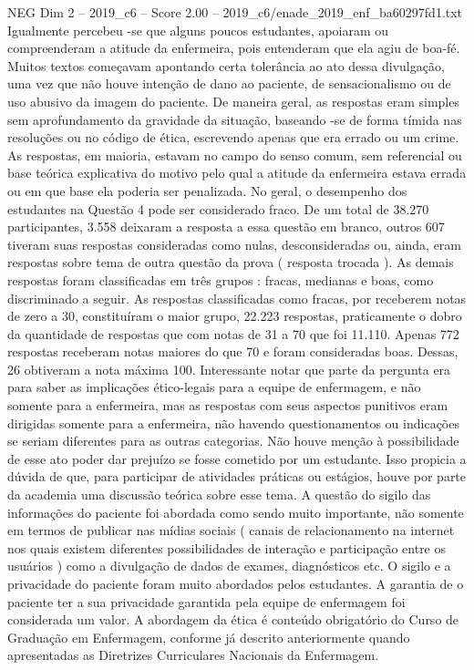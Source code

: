 \begin{textsample}{NEG Dim 2 – 2019\_c6 – Score 2.00 – 2019\_c6/enade\_2019\_enf\_ba60297fd1.txt}
Igualmente percebeu -se que alguns poucos estudantes, apoiaram ou compreenderam a atitude da enfermeira, pois entenderam que ela agiu de boa-fé.
Muitos textos começavam apontando certa tolerância ao ato dessa divulgação, uma vez que não houve intenção de dano ao paciente, de sensacionalismo ou de uso abusivo da imagem do paciente.
De maneira geral, as respostas eram simples sem aprofundamento da gravidade da situação, baseando -se de forma tímida nas resoluções ou no código de ética, escrevendo apenas que era errado ou um crime.
As respostas, em maioria, estavam no campo do senso comum, sem referencial ou base teórica explicativa do motivo pelo qual a atitude da enfermeira estava errada ou em que base ela poderia ser penalizada.
No geral, o desempenho dos estudantes na Questão 4 pode ser considerado fraco.
De um total de 38.270 participantes, 3.558 deixaram a resposta a essa questão em branco, outros 607 tiveram suas respostas consideradas como nulas, desconsideradas ou, ainda, eram respostas sobre tema de outra questão da prova ( resposta trocada ).
As demais respostas foram classificadas em três grupos : fracas, medianas e boas, como discriminado a seguir.
As respostas classificadas como fracas, por receberem notas de zero a 30, constituíram o maior grupo, 22.223 respostas, praticamente o dobro da quantidade de respostas que com notas de 31 a 70 que foi 11.110.
Apenas 772 respostas receberam notas maiores do que 70 e foram consideradas boas.
Dessas, 26 obtiveram a nota máxima 100.
Interessante notar que parte da pergunta era para saber as implicações ético-legais para a equipe de enfermagem, e não somente para a enfermeira, mas as respostas com seus aspectos punitivos eram dirigidas somente para a enfermeira, não havendo questionamentos ou indicações se seriam diferentes para as outras categorias.
Não houve menção à possibilidade de esse ato poder dar prejuízo se fosse cometido por um estudante.
Isso propicia a dúvida de que, para participar de atividades práticas ou estágios, houve por parte da academia uma discussão teórica sobre esse tema.
A questão do sigilo das informações do paciente foi abordada como sendo muito importante, não somente em termos de publicar nas mídias sociais ( canais de relacionamento na internet nos quais existem diferentes possibilidades de interação e participação entre os usuários ) como a divulgação de dados de exames, diagnósticos etc.
O sigilo e a privacidade do paciente foram muito abordados pelos estudantes.
A garantia de o paciente ter a sua privacidade garantida pela equipe de enfermagem foi considerada um valor.
A abordagem da ética é conteúdo obrigatório do Curso de Graduação em Enfermagem, conforme já descrito anteriormente quando apresentadas as Diretrizes Curriculares Nacionais da Enfermagem.

\end{textsample}
